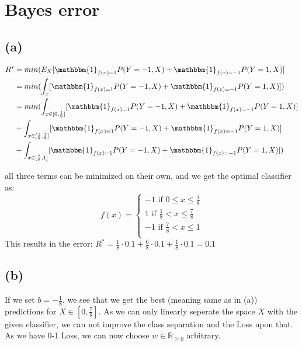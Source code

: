\documentclass[a4paper]{scrartcl}
\begin{document}
\section{Bayes error}
  \subsection*{(a)}

    \begin{align*}
      R^* &= min(E_X[\mathbbm{1}_{f(x)= 1} P(Y=-1, X) + \mathbbm{1}_{f(x)= -1} P(Y=1, X)]\\
      & = min(\int_x [\mathbbm{1}_{f(x)= 1} P(Y=-1, X) + \mathbbm{1}_{f(x)= -1} P(Y=1, X)])\\
      & = min(\int_{x \in [0, \frac{1}{8}]}[\mathbbm{1}_{f(x)= 1} P(Y=-1, X) + \mathbbm{1}_{f(x)= -1} P(Y=1, X)]\\
      & + \int_{x \in [\frac{1}{8}, \frac{7}{8}]}[\mathbbm{1}_{f(x)= 1} P(Y=-1, X) + \mathbbm{1}_{f(x)= -1} P(Y=1, X)]\\
      & + \int_{x \in [\frac{7}{8}, 1]}[\mathbbm{1}_{f(x)= 1} P(Y=-1, X) + \mathbbm{1}_{f(x)= -1} P(Y=1, X)])\\
    \end{align*}

    
    all three terms can be minimized on their own, and we get the optimal classifier as:
$$f(x) = \begin{cases}
      -1 \text{ if }  0 \leq x \leq \frac{1}{8}\\
      1 \text{ if }  \frac{1}{8} < x \leq \frac{7}{8}\\
      -1 \text{ if }  \frac{7}{8} < x \leq 1\\
    \end{cases}$$
    This results in the error:
    $R^* =  \frac{1}{8} \cdot 0.1 + \frac{6}{8} \cdot 0.1 + \frac{1}{8} \cdot 0.1 = 0.1$


  \subsection*{(b)}
    If we set $b = -\frac{1}{8}$, we see that we get the best (meaning same as
    in (a)) predictions for $X \in [0, \frac{7}{8}]$. As we can only linearly
    seperate the space $X$ with the given classifier, we can not improve the class
    separation and the Loss upon that. As we have 0-1 Loss, we can now choose $w \in
    \mathbb{R}_{\ge 0}$ arbitrary.
\end{document}
